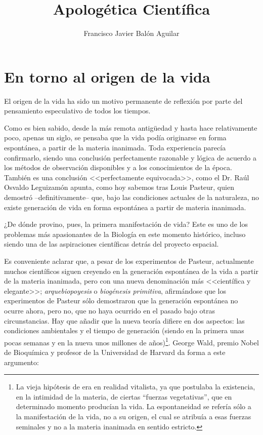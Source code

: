 \documentclass[11pt, oneside, titlepage]{book}
\title{\textbf{Apologética Científica}}
\author{Francisco Javier Balón Aguilar}
\begin{document}
\maketitle
\tableofcontents
\newpage

\chapter{En torno al origen de la vida}

    El origen de la vida ha sido un motivo permanente de reflexión por parte del pensamiento especulativo 
    de todos los tiempos.
    
    Como es bien sabido, desde la más remota antigüedad y hasta hace relativamente poco, apenas un siglo, 
    se pensaba que la vida podía originarse en forma espontánea, a partir de la materia inanimada. Toda 
    experiencia parecía confirmarlo, siendo una conclusión perfectamente razonable y lógica de acuerdo a 
    los métodos de observación disponibles y a los conocimientos de la época. También es una conclusión 
    <<perfectamente equivocada>>, como el Dr. Raúl Osvaldo Leguizamón apunta, como hoy sabemos tras Louis 
    Pasteur, quien demostró --definitivamente-- que, bajo las condiciones actuales de la naturaleza, no 
    existe generación de vida en forma espontánea a partir de materia inanimada.

    ¿De dónde provino, pues, la primera manifestación de vida? Este es uno de los problemas más apasionantes 
    de la Biología en este momento histórico, incluso siendo una de las aspiraciones científicas detrás del 
    proyecto espacial.

    Es conveniente aclarar que, a pesar de los experimentos de Pasteur, actualmente muchos científicos
    siguen creyendo en la generación espontánea de la vida a partir de la materia inanimada, pero con una 
    nueva denominación más <<científica y elegante>>; \textit{arquebiopoyesis} o \textit{biogénesis primitiva}, 
    afirmándose que los experimentos de Pasteur sólo demostraron que la generación espontánea no ocurre ahora,
    pero no, que no haya ocurrido en el pasado bajo otras circunstancias. Hay que añadir que la nueva teoría
    difiere en dos aspectos: las condiciones ambientales y el tiempo de generación (siendo en la primera unas 
    pocas semanas y en la nueva unos millones de años)\footnote{
        La vieja hipótesis de era en realidad vitalista, ya que postulaba la existencia, en la intimidad de la materia, 
        de ciertas “fuerzas vegetativas”, que en determinado momento producían la vida. La
        espontaneidad se refería sólo a la manifestación de la vida, no a su origen, el cual se atribuía a esas fuerzas
        seminales y no a la materia inanimada en sentido estricto.    
    }. George Wald, premio Nobel de 
    Bioquímica y profesor de la Universidad de Harvard da forma a este argumento:
\end{document}
